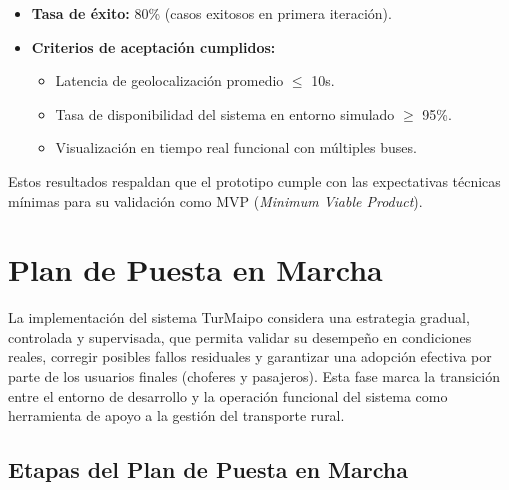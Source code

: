\documentclass[12pt]{article}
\begin{document}
\begin{itemize}
    \item \textbf{Tasa de éxito:} 80\% (casos exitosos en primera iteración).
    \item \textbf{Criterios de aceptación cumplidos:}
    \begin{itemize}
        \item Latencia de geolocalización promedio $\leq$ 10s.
        \item Tasa de disponibilidad del sistema en entorno simulado $\geq$ 95\%.
        \item Visualización en tiempo real funcional con múltiples buses.
    \end{itemize}
\end{itemize}

Estos resultados respaldan que el prototipo cumple con las expectativas técnicas mínimas para su validación como MVP (\emph{Minimum Viable Product}).

\clearpage
\section{Plan de Puesta en Marcha}
La implementación del sistema TurMaipo considera una estrategia gradual, controlada y supervisada, que permita validar su desempeño en condiciones reales, corregir posibles fallos residuales y garantizar una adopción efectiva por parte de los usuarios finales (choferes y pasajeros). Esta fase marca la transición entre el entorno de desarrollo y la operación funcional del sistema como herramienta de apoyo a la gestión del transporte rural.

\subsection{Etapas del Plan de Puesta en Marcha}
\end{document}
